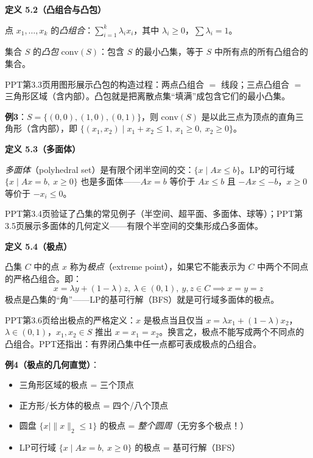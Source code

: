 \begin{defbox}
\textbf{定义 5.2（凸组合与凸包）}

点 $x_1,\dots,x_k$ 的\emph{凸组合}：$\sum_{i=1}^k \lambda_i x_i$，其中 $\lambda_i \ge 0$，$\sum \lambda_i = 1$。

集合 $S$ 的\emph{凸包} $\text{conv}(S)$：包含 $S$ 的最小凸集，等于 $S$ 中所有点的所有凸组合的集合。
\end{defbox}

\medskip
PPT第3.3页用图形展示凸包的构造过程：两点凸组合 $=$ 线段；三点凸组合 $=$ 三角形区域（含内部）。凸包就是把离散点集“填满”成包含它们的最小凸集。
\medskip
{}
\medskip

\textbf{例3}：$S = \{(0,0),(1,0),(0,1)\}$，则 $\text{conv}(S)$ 是以此三点为顶点的直角三角形（含内部），即 $\{(x_1,x_2) \mid x_1+x_2 \le 1,\ x_1 \ge 0,\ x_2 \ge 0\}$。

\begin{defbox}
\textbf{定义 5.3（多面体）}

\emph{多面体}（polyhedral set）是有限个闭半空间的交：$\{x \mid Ax \le b\}$。LP的可行域 $\{x \mid Ax = b,\ x \ge 0\}$ 也是多面体——$Ax=b$ 等价于 $Ax\le b$ 且 $-Ax\le -b$，$x\ge0$ 等价于 $-x_i\le 0$。
\end{defbox}

\medskip
PPT第3.4页验证了凸集的常见例子（半空间、超平面、多面体、球等）；PPT第3.5页展示多面体的几何定义——有限个半空间的交集形成凸多面体。
\medskip
{}
\medskip
{}
\medskip

\begin{defbox}
\textbf{定义 5.4（极点）}

凸集 $C$ 中的点 $x$ 称为\emph{极点}（extreme point），如果它不能表示为 $C$ 中两个不同点的严格凸组合。即：
{\small
\[
x = \lambda y + (1-\lambda)z,\ \lambda\in(0,1),\ y,z\in C \implies x=y=z
\]
}
极点是凸集的“角”——LP的基可行解（BFS）就是可行域多面体的极点。
\end{defbox}

\medskip
PPT第3.6页给出极点的严格定义：$x$ 是极点当且仅当 $x=\lambda x_1+(1-\lambda)x_2$，$\lambda\in(0,1)$，$x_1,x_2\in S$ 推出 $x=x_1=x_2$。换言之，极点不能写成两个不同点的凸组合。PPT还指出：有界闭凸集中任一点都可表成极点的凸组合。
\medskip
{}
\medskip

\textbf{例4（极点的几何直觉）}：
\begin{itemize}
  \item 三角形区域的极点 = 三个顶点
  \item 正方形/长方体的极点 = 四个/八个顶点
  \item 圆盘 $\{x \mid \|x\|_2 \le 1\}$ 的极点 = \emph{整个圆周}（无穷多个极点！）
  \item LP可行域 $\{x \mid Ax=b,\ x\ge0\}$ 的极点 = 基可行解（BFS）
\end{itemize}

